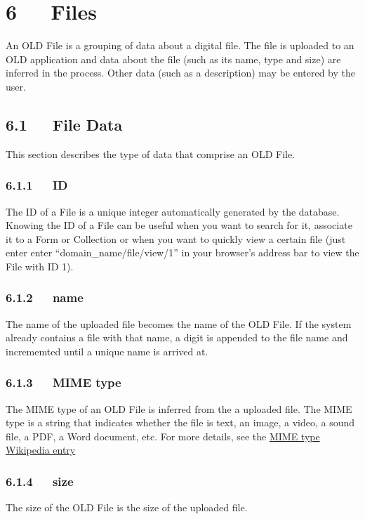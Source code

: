 \documentclass[letterpaper,10pt,english]{sphinxmanual}
\begin{document}
\chapter{6   Files}
\label{user_guide:files}
An OLD File is a grouping of data about a digital file.  The file is uploaded to
an OLD application and data about the file (such as its name, type and size) are
inferred in the process.  Other data (such as a description) may be entered by
the user.


\section{6.1   File Data}
\label{user_guide:file-data}
This section describes the type of data that comprise an OLD File.


\subsection{6.1.1   ID}
\label{user_guide:id1}
The ID of a File is a unique integer automatically generated by the database.
Knowing the ID of a File can be useful when you want to search for it, associate
it to a Form or Collection or when you want to quickly view a certain file (just
enter enter ``domain\_name/file/view/1'' in your browser's address bar to view the
File with ID 1).


\subsection{6.1.2   name}
\label{user_guide:name}
The name of the uploaded file becomes the name of the OLD File.  If the system
already contains a file with that name, a digit is appended to the file name and
incrememted until a unique name is arrived at.


\subsection{6.1.3   MIME type}
\label{user_guide:mime-type}
The MIME type of an OLD File is inferred from the a uploaded file.  The MIME
type is a string that indicates whether the file is text, an image, a video, a
sound file, a PDF, a Word document, etc.  For more details, see the \href{http://en.wikipedia.org/wiki/MIME\_type}{MIME type
Wikipedia entry}


\subsection{6.1.4   size}
\label{user_guide:size}
The size of the OLD File is the size of the uploaded file.
\end{document}
